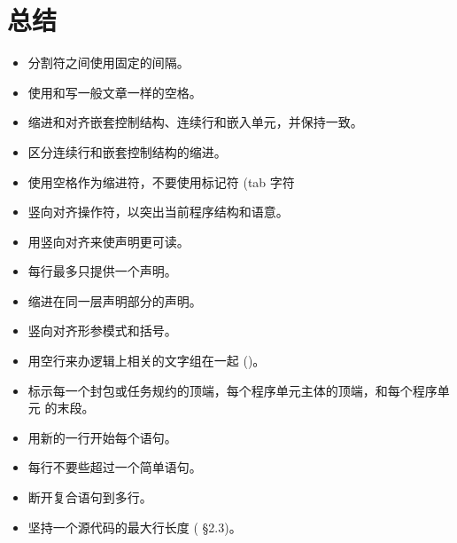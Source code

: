 \section{总结}
\begin{itemize}
    \item 分割符之间使用固定的间隔。
    \item 使用和写一般文章一样的空格。
    \item 缩进和对齐嵌套控制结构、连续行和嵌入单元，并保持一致。
    \item 区分连续行和嵌套控制结构的缩进。
    \item 使用空格作为缩进符，不要使用标记符 (tab 字符\cite{nissen84}
    \item 竖向对齐操作符，以突出当前程序结构和语意。
    \item 用竖向对齐来使声明更可读。
    \item 每行最多只提供一个声明。
    \item 缩进在同一层声明部分的声明。
    \item 竖向对齐形参模式和括号。
    \item 用空行来办逻辑上相关的文字组在一起 (\cite{nasa87})。
    \item 标示每一个封包或任务规约的顶端，每个程序单元主体的顶端，和每个程序单元
的末段。
    \item 用新的一行开始每个语句。
    \item 每行不要些超过一个简单语句。
    \item 断开复合语句到多行。
    \item 坚持一个源代码的最大行长度 (\cite{nissen84} \S{}2.3)。
\end{itemize}

